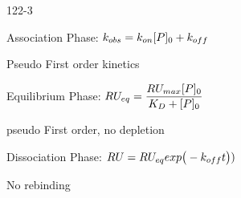 \begin{mitframe}{122-3}
\begin{listone}
	\item Association Phase: $\thermcond_{obs}=\thermcond_{on}[\p]_{\init}+\thermcond_{off}$
    	\begin{listtwo}
        	\item Pseudo First order kinetics
        \end{listtwo}
	\item Equilibrium Phase: $\gasconst\uvel_{eq}=\dfrac{\gasconst\uvel_{max}[\p]_{\init}}{\dilfac_{\elecdisplace}+[\p]_{\init}}$
    		\begin{listtwo}
            	\item pseudo First order, no depletion
            \end{listtwo}
	\item Dissociation Phase: $\gasconst\uvel=\gasconst\uvel_{eq}exp\big(-\thermcond_{off}\timet\big))$
    	\begin{listtwo}
        	\item No rebinding
        \end{listtwo}
\end{listone}        
\end{mitframe}